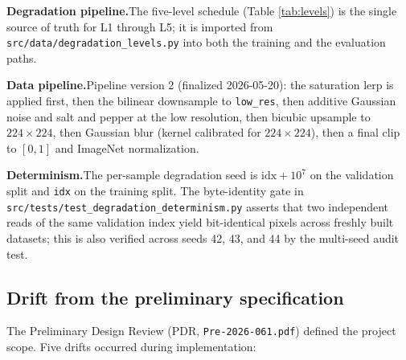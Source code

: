 \textbf{Degradation pipeline.}\quad The five-level schedule (Table
\ref{tab:levels}) is the single source of truth for L1 through L5; it is
imported from \texttt{src/data/degradation\_levels.py} into both the training
and the evaluation paths.



\textbf{Data pipeline.}\quad Pipeline version 2 (finalized 2026-05-20):
the saturation lerp is applied first, then the bilinear
downsample to \texttt{low\_res}, then additive Gaussian noise and salt and
pepper at the low resolution, then bicubic upsample to $224 \times 224$,
then Gaussian blur (kernel calibrated for $224 \times 224$), then a final
clip to $[0, 1]$ and ImageNet normalization.

\textbf{Determinism.}\quad The per-sample degradation seed is
$\text{idx} + 10^7$ on the validation split and \texttt{idx} on the training
split. The byte-identity gate in
\texttt{src/tests/test\_degradation\_determinism.py} asserts that two
independent reads of the same validation index yield bit-identical pixels
across freshly built datasets; this is also verified across seeds 42, 43,
and 44 by the multi-seed audit test.

\subsection{Drift from the preliminary specification}

The Preliminary Design Review (PDR, \texttt{Pre-2026-061.pdf}) defined the
project scope. Five drifts occurred during implementation:

